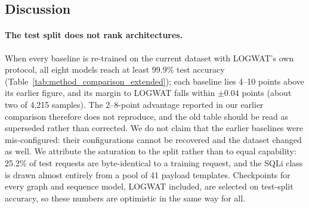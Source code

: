 \subsection{Discussion}

\paragraph{The test split does not rank architectures.}
When every baseline is re-trained on the current dataset with LOGWAT's own protocol, all eight models reach at least 99.9\% test accuracy (Table~\ref{tab:method_comparison_extended}); each baseline lies 4--10 points above its earlier figure, and its margin to LOGWAT falls within $\pm$0.04 points (about two of 4{,}215 samples). The 2--8-point advantage reported in our earlier comparison therefore does not reproduce, and the old table should be read as superseded rather than corrected. We do not claim that the earlier baselines were mis-configured: their configurations cannot be recovered and the dataset changed as well. We attribute the saturation to the split rather than to equal capability: 25.2\% of test requests are byte-identical to a training request, and the SQLi class is drawn almost entirely from a pool of 41 payload templates. Checkpoints for every graph and sequence model, LOGWAT included, are selected on test-split accuracy, so these numbers are optimistic in the same way for all.

